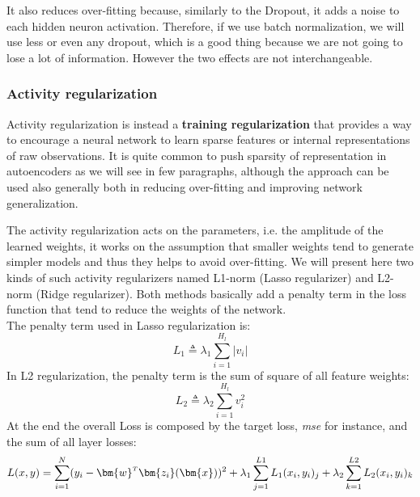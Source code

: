 It also reduces over-fitting because, similarly to the Dropout, it adds a noise to each hidden neuron activation. Therefore, if we use batch normalization, we will use less or even any dropout, which is a good thing because we are not going to lose a lot of information. However the two effects are not interchangeable.
%

\subsubsection{Activity regularization}
Activity regularization is instead a \textbf{training regularization} that provides a way to encourage a neural network to learn sparse features or internal representations of raw observations.
It is quite common to push sparsity of representation in autoencoders as we will see in few paragraphs, although the approach can be used also generally both in reducing over-fitting and improving network generalization.

The activity regularization acts on the parameters, i.e. the amplitude of the learned weights, it works on the assumption that smaller weights tend to generate simpler models and thus they helps to avoid over-fitting. We will present here two kinds of such activity regularizers named L1-norm (Lasso regularizer) and L2-norm (Ridge regularizer). Both methods basically add a penalty term in the loss function that tend to reduce the weights of the network. \\
The penalty term used in Lasso regularization is:
\begin{equation}
    L_1 \triangleq \lambda_1 \sum_{i=1}^{H_l} \left| v_i \right|
\end{equation}
In L2 regularization, the penalty term is the sum of square of all feature weights:
\begin{equation}
    L_2 \triangleq \lambda_2 \sum_{i=1}^{H_l} v_i^2
\end{equation}
At the end the overall Loss is composed by the target loss, \textit{mse} for instance, and the sum of all layer losses:
\begin{equation}
    L(x,y) = \sum_{i=1}^N (y_i - \transpose{\bm{w}}\bm{z_i}(\bm{x}))^2 + \lambda_1 \sum_{j=1}^{L1} L_1(x_i,y_i)_j + \lambda_2 \sum_{k=1}^{L2} L_2(x_i,y_i)_k
\end{equation}


